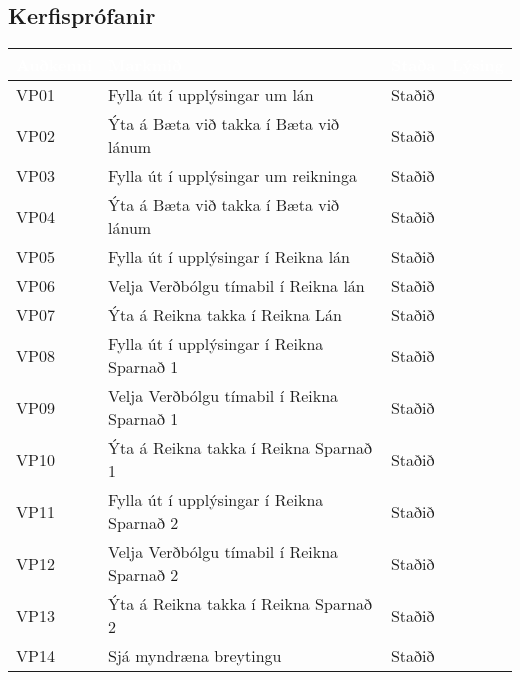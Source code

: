 \documentclass[a4paper, 12 pt]{article}
\begin{document}
\subsection{Kerfisprófanir}
\begin{center}
    \begin{tabular}{| l | p{6cm} | l | l |}
    \hline
    \rowcolor{LightBlue!65}
     \textcolor{White}{Auðkenni} & \textcolor{White}{Markmið} & \textcolor{White}{Staða} & \textcolor{White}{Lýsing} \\ 
     \hline
     \hline
    \rowcolor{LightCol!30}
    VP01 & Fylla út í upplýsingar um lán & Staðið & \\ \hline
    VP02 & Ýta á Bæta við takka í Bæta við lánum & Staðið & \\ \hline
    \rowcolor{LightCol!30}
    VP03 & Fylla út í upplýsingar um reikninga & Staðið & \\ \hline
    VP04 & Ýta á Bæta við takka í Bæta við lánum & Staðið & \\ \hline
    \rowcolor{LightCol!30}
    VP05 & Fylla út í upplýsingar í Reikna lán & Staðið & \\ \hline
    VP06 & Velja Verðbólgu tímabil í Reikna lán & Staðið & \\ \hline
    \rowcolor{LightCol!30}
    VP07 & Ýta á Reikna takka í Reikna Lán & Staðið & \\ \hline
    VP08 & Fylla út í upplýsingar í Reikna Sparnað 1& Staðið & \\ \hline
    \rowcolor{LightCol!30}
    VP09 & Velja Verðbólgu tímabil í Reikna Sparnað 1 & Staðið & \\ \hline
    VP10 & Ýta á Reikna takka í Reikna Sparnað 1 & Staðið & \\ \hline
    \rowcolor{LightCol!30}
    VP11 & Fylla út í upplýsingar í Reikna Sparnað 2& Staðið & \\ \hline
    VP12 & Velja Verðbólgu tímabil í Reikna Sparnað 2 & Staðið & \\ \hline
    \rowcolor{LightCol!30}
    VP13 & Ýta á Reikna takka í Reikna Sparnað 2 & Staðið & \\ \hline
    VP14 & Sjá myndræna breytingu & Staðið & \\ \hline    
    \end{tabular}
\end{center}
\end{document}

